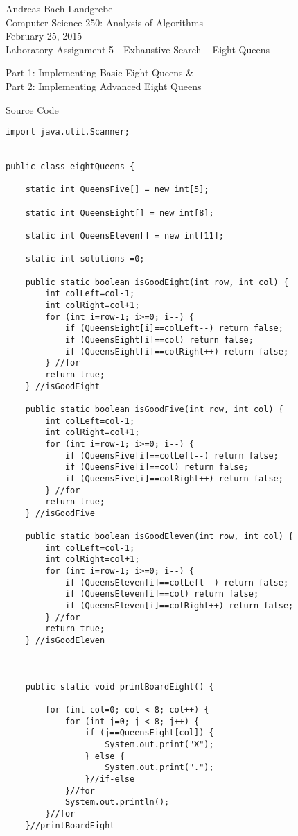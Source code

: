 \documentclass{article}
\begin{document}
\begin{center}
Andreas Bach Landgrebe \\
Computer Science 250: Analysis of Algorithms \\
February 25, 2015 \\
Laboratory Assignment 5 - Exhaustive Search – Eight Queens \\
\end{center}
\newpage
\noindent
Part 1: Implementing Basic Eight Queens \& \\ Part 2: Implementing Advanced Eight Queens \\
\begin{center}
Source Code
\end{center}
\begin{lstlisting}
import java.util.Scanner;


public class eightQueens {

	static int QueensFive[] = new int[5];

	static int QueensEight[] = new int[8];

	static int QueensEleven[] = new int[11];

	static int solutions =0;
	
	public static boolean isGoodEight(int row, int col) {
		int colLeft=col-1;
		int colRight=col+1;
		for (int i=row-1; i>=0; i--) {
			if (QueensEight[i]==colLeft--) return false;
			if (QueensEight[i]==col) return false;
			if (QueensEight[i]==colRight++) return false;
		} //for
		return true;
	} //isGoodEight

	public static boolean isGoodFive(int row, int col) {
		int colLeft=col-1;
		int colRight=col+1;
		for (int i=row-1; i>=0; i--) {
			if (QueensFive[i]==colLeft--) return false;
			if (QueensFive[i]==col) return false;
			if (QueensFive[i]==colRight++) return false;
		} //for
		return true;
	} //isGoodFive

	public static boolean isGoodEleven(int row, int col) {
		int colLeft=col-1;
		int colRight=col+1;
		for (int i=row-1; i>=0; i--) {
			if (QueensEleven[i]==colLeft--) return false;
			if (QueensEleven[i]==col) return false;
			if (QueensEleven[i]==colRight++) return false;
		} //for
		return true;
	} //isGoodEleven


	
	public static void printBoardEight() {

		for (int col=0; col < 8; col++) {
			for (int j=0; j < 8; j++) {
				if (j==QueensEight[col]) {
					System.out.print("X");
				} else {
					System.out.print(".");					
				}//if-else
			}//for
			System.out.println();
		}//for	
	}//printBoardEight


\end{lstlisting}
\end{document}

